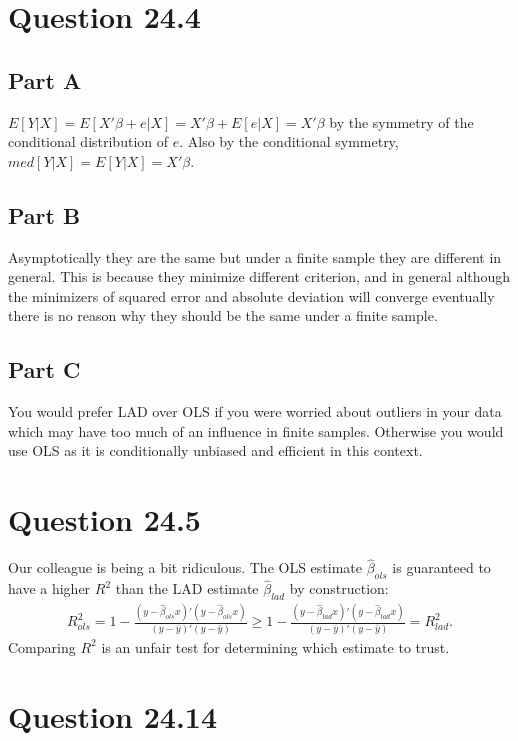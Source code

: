 \documentclass[11pt]{article} %
\begin{document}
\section{Question 24.4}
\subsection{Part A}
$E[Y|X] = E[X'\beta + e|X] = X'\beta + E[e|X] = X'\beta$ by the symmetry of the conditional distribution of $e$. Also by the conditional symmetry, $med[Y|X] = E[Y|X] = X'\beta$.
\subsection{Part B}
Asymptotically they are the same but under a finite sample they are different in general. This is because they minimize different criterion, and in general although the minimizers of squared error and absolute deviation will converge eventually there is no reason why they should be the same under a finite sample.
\subsection{Part C}
You would prefer LAD over OLS if you were worried about outliers in your data which may have too much of an influence in finite samples. Otherwise you would use OLS as it is conditionally unbiased and efficient in this context.
\section{Question 24.5}
Our colleague is being a bit ridiculous. The OLS estimate $\hat{\beta}_{ols}$ is guaranteed to have a higher $R^2$ than the LAD estimate $\hat{\beta}_{lad}$ by construction: \\\begin{align*}R^2_{ols} = 1 - \frac{(y-\hat{\beta}_{ols}x)'(y-\hat{\beta}_{ols}x)}{(y-\bar{y})'(y-\bar{y})} \geq  1 - \frac{(y-\hat{\beta}_{lad}x)'(y-\hat{\beta}_{lad}x)}{(y-\bar{y})'(y-\bar{y})} = R^2_{lad}.\end{align*} Comparing $R^2$ is an unfair test for determining which estimate to trust.
\section{Question 24.14} 
\end{document}
